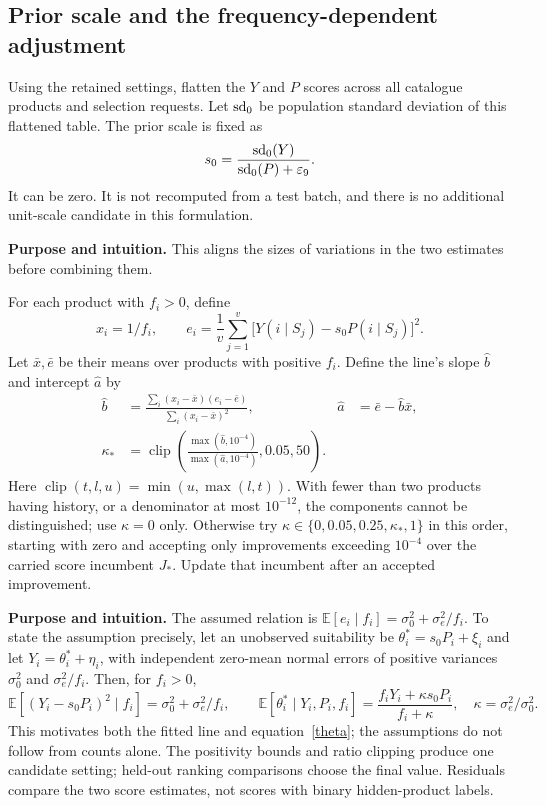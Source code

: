 \documentclass[11pt,a4paper]{article}
\newcommand{\why}{\par\textbf{Purpose and intuition.} }
\numberwithin{equation}{section}
\begin{document}
\subsection{Prior scale and the frequency-dependent adjustment}
Using the retained settings, flatten the $Y$ and $P$ scores across all catalogue products
and selection requests. Let $\operatorname{sd}_0$ be population standard deviation of this flattened table.
The prior scale is fixed as
\begin{equation}
s_0=\frac{\operatorname{sd}_0(Y)}{\operatorname{sd}_0(P)+\varepsilon_9}.
\end{equation}
It can be zero. It is not recomputed from a test batch, and there is no additional
unit-scale candidate in this formulation.
\why This aligns the sizes of variations in the two estimates before combining them.

For each product with $f_i>0$, define
\begin{equation}
x_i=1/f_i,\qquad e_i=\frac1v\sum_{j=1}^v
\bigl[Y(i\mid S_j)-s_0P(i\mid S_j)\bigr]^2.
\end{equation}
Let $\bar x,\bar e$ be their means over products with positive $f_i$. Define the line's
slope $\widehat b$ and intercept $\widehat a$ by
\begin{align}
\widehat b&=\frac{\sum_i(x_i-\bar x)(e_i-\bar e)}{\sum_i(x_i-\bar x)^2},&
\widehat a&=\bar e-\widehat b\bar x,\\
\kappa_*&=\operatorname{clip}\left(\frac{\max(\widehat b,10^{-4})}{\max(\widehat a,10^{-4})},0.05,50\right).
\end{align}
Here $\operatorname{clip}(t,l,u)=\min(u,\max(l,t))$. With fewer than two products having
history, or a denominator at most $10^{-12}$, the components cannot be distinguished;
use $\kappa=0$ only. Otherwise try $\kappa\in\{0,0.05,0.25,\kappa_*,1\}$ in this
order, starting with zero and accepting only improvements exceeding $10^{-4}$ over the
carried score incumbent $J_*$. Update that incumbent after an accepted improvement.

\why The assumed relation is $\mathbb E[e_i\mid f_i]=\sigma_0^2+\sigma_e^2/f_i$.
To state the assumption precisely, let an unobserved suitability be
$\theta_i^*=s_0P_i+\xi_i$ and let $Y_i=\theta_i^*+\eta_i$, with independent zero-mean
normal errors of positive variances $\sigma_0^2$ and $\sigma_e^2/f_i$. Then, for $f_i>0$,
\begin{equation}
\mathbb E[(Y_i-s_0P_i)^2\mid f_i]=\sigma_0^2+\sigma_e^2/f_i,\qquad
\mathbb E[\theta_i^*\mid Y_i,P_i,f_i]
=\frac{f_iY_i+\kappa s_0P_i}{f_i+\kappa},\quad
\kappa=\sigma_e^2/\sigma_0^2.
\end{equation}
This motivates both the fitted line and equation~\eqref{theta}; the assumptions do not
follow from counts alone. The positivity bounds and ratio clipping produce one candidate
setting; held-out ranking comparisons choose the final value. Residuals compare the two
score estimates, not scores with binary hidden-product labels.
\end{document}

